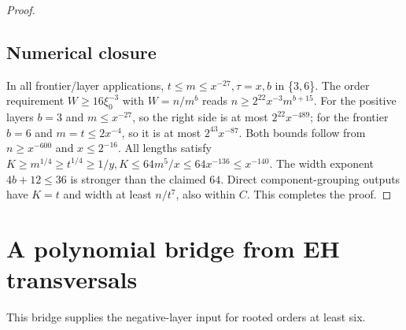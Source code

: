 \documentclass[11pt,a4paper]{article}
\theoremstyle{definition}
\theoremstyle{remark}
\numberwithin{equation}{section}
\begin{document}
\begin{proof}
\subsection{Numerical closure}\label{subsec:rp5-checks}
In all frontier/layer applications, \(t\le\allowbreak m\le\allowbreak x^{-27},\allowbreak  \tau=x,\allowbreak  b\) in \{\(3,\allowbreak 6\)\}. The order requirement \(W\ge 16\xi_{0}^{-3}\) with \(W=n/m^{b}\) reads \(n\ge 2^{22} x^{-3} m^{b+15}\). For the positive layers \(b=3\) and \(m\le x^{-27}\), so the right side is at most \(2^{22} x^{-489}\); for the frontier \(b=6\) and \(m=t\le 2x^{-4}\), so it is at most \(2^{43} x^{-87}\). Both bounds follow from \(n\ge x^{-600}\) and \(x\le 2^{-16}\). All lengths satisfy \(K\ge\allowbreak m^{1/4}\ge\allowbreak t^{1/4}\ge\allowbreak 1/y,\allowbreak  K\le\allowbreak 64m^{5}/x\le\allowbreak 64x^{-136}\le\allowbreak x^{-140}\). The width exponent \(4b+12\le\allowbreak 36\) is stronger than the claimed \(64\). Direct component-grouping outputs have \(K=t\) and width at least \(n/t^{7}\), also within \(C\). This completes the proof.
\end{proof}

\section{A polynomial bridge from EH transversals}\label{app:bridge}

This bridge supplies the negative-layer input for rooted orders at least six.
\end{document}
